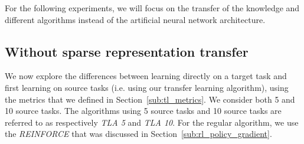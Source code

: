 For the following experiments, we will focus on the transfer of the knowledge and different algorithms instead of the artificial neural network architecture.

\subsection{Without sparse representation transfer} %
\label{sub:without_sparse_representation_transfer}
We now explore the differences between learning directly on a target task and first learning on source tasks (i.e. using our transfer learning algorithm), using the metrics that we defined in Section~\ref{sub:tl_metrics}.
We consider both 5 and 10 source tasks.
The algorithms using 5 source tasks and 10 source tasks are referred to as respectively \textit{TLA 5} and \textit{TLA 10}.
For the regular algorithm, we use the \textit{REINFORCE} that was discussed in Section~\ref{sub:rl_policy_gradient}.

